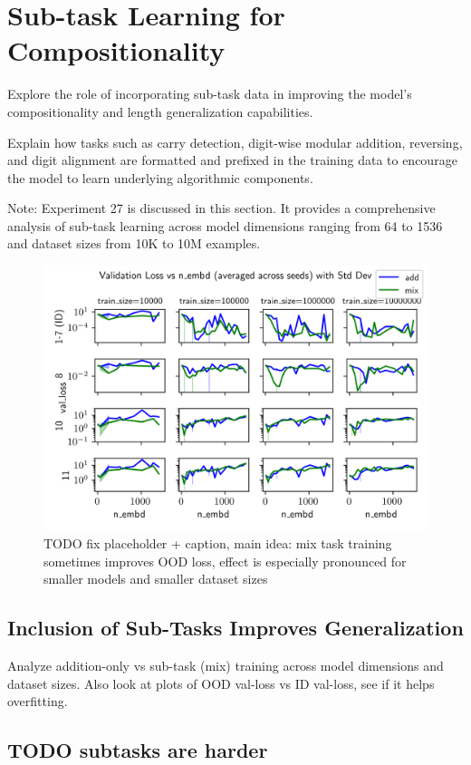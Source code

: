 \section{Sub-task Learning for Compositionality}\label{sec:subtask_learning}
Explore the role of incorporating sub-task data in improving the model's compositionality and length generalization capabilities.

Explain how tasks such as carry detection, digit-wise modular addition, reversing, and digit alignment are formatted and prefixed in the training data to encourage the model to learn underlying algorithmic components.

Note: Experiment 27 is discussed in this section. It provides a comprehensive analysis of sub-task learning across model dimensions ranging from 64 to 1536 and dataset sizes from 10K to 10M examples.



\begin{figure}[h!]
    \centering
    \includegraphics[width=\textwidth]{fig/exp_27_val_loss_vs_n_embd.png}
    \caption{TODO fix placeholder + caption, main idea: mix task training sometimes improves OOD loss, effect is especially pronounced for smaller models and smaller dataset sizes}
    \label{fig:exp_27_val_loss_vs_n_embd}
\end{figure}


\subsection{Inclusion of Sub-Tasks Improves Generalization}
Analyze addition-only vs sub-task (mix) training across model dimensions and dataset sizes. Also look at plots of OOD val-loss vs ID val-loss, see if it helps overfitting.

\subsection{TODO subtasks are harder}

